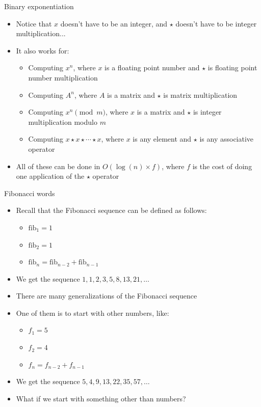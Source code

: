 \documentclass[10pt]{beamer}
\newcommand{\bi}{\begin{itemize}}
\newcommand{\ei}{\end{itemize}}
\begin{document}
\begin{frame}{Binary exponentiation}
    \bi
        \item Notice that $x$ doesn't have to be an integer, and $\star$ doesn't have to be integer multiplication...
        \item It also works for:
            \bi
                \item Computing $x^n$, where $x$ is a floating point number and $\star$ is floating point number multiplication
                \item Computing $A^n$, where $A$ is a matrix and $\star$ is matrix multiplication
                \item Computing $x^n \pmod{m}$, where $x$ is a matrix and $\star$ is integer multiplication modulo $m$
                \item Computing $x\star x\star \cdots \star x$, where $x$ is any element and $\star$ is any associative operator
            \ei

        \item All of these can be done in $O(\log(n) \times f)$, where $f$ is the cost of doing one application of the $\star$ operator
    \ei
\end{frame}

\begin{frame}{Fibonacci words}
    \bi
        \item Recall that the Fibonacci sequence can be defined as follows:
            \bi
        \item $\mathrm{fib}_1 = 1$
        \item $\mathrm{fib}_2 = 1$
        \item $\mathrm{fib}_n = \mathrm{fib}_{n-2} + \mathrm{fib}_{n-1}$
            \ei
        \item We get the sequence $1, 1, 2, 3, 5, 8, 13, 21, \ldots$
        \vspace{10pt}
        \item There are many generalizations of the Fibonacci sequence
        \item One of them is to start with other numbers, like:
            \bi
                \item $f_1 = 5$
                \item $f_2 = 4$
                \item $f_n = f_{n-2} + f_{n-1}$
            \ei
        \item We get the sequence $5, 4, 9, 13, 22, 35, 57, \ldots$
        \vspace{10pt}
        \item What if we start with something other than numbers?
    \ei
\end{frame}
\end{document}
